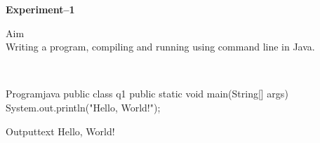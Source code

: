 \documentclass[11pt]{ipu-ai}
\renewcommand{\experiment}[2]{%
    \begin{center}%
        \textbf{\Huge Experiment--#1}\\[30pt]%
    \end{center}%
    \begin{tabularsection}{Aim}%
        ~\\#2\\%
    \end{tabularsection}}
\begin{document}
    \maketitle
    

    \experiment{1}{Writing a program, compiling and running using command line in Java.}\\%
    \begin{code}
        {Program}{java}
public class q1 {
    public static void main(String[] args) {
        System.out.println("Hello, World!");
    }
}
    \end{code}%
    \begin{code}
        {Output}{text}
Hello, World!
    \end{code}
    \vspace*{10pt}

\end{document}
